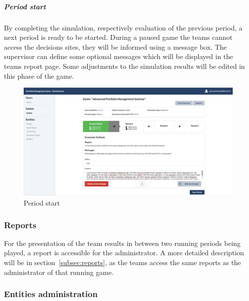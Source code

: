 \subparagraph{Period start}
By completing the simulation, respectively evaluation of the previous period, a next period is ready to be started. During a paused game the teams cannot access the decisions sites, they will be informed using a message box. The supervisor can define some optional messages which will be displayed in the teams report page. Some adjustments to the simulation results will be edited in this phase of the game.
\begin{figure}[h!]
  \centering
  \includegraphics[scale=0.2]{img/application-overview/administrator/09_period_start.png}
  \caption{Period start}
\end{figure}

\subsubsection{Reports}
For the presentation of the team results in between two running periods being played, a report is accessible for the administrator. A more detailed description will be in section~\ref{subsec:reports}, as the teams access the same reports as the administrator of that running game.


\subsubsection{Entities administration}

